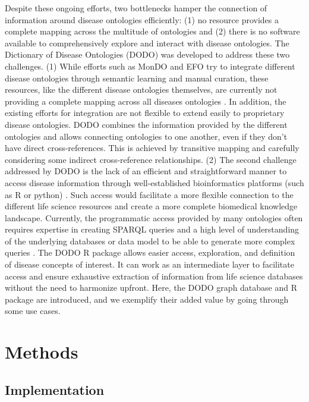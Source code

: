 \documentclass[9pt,a4paper,]{extarticle}
\begin{document}
Despite these ongoing efforts, two bottlenecks hamper the connection of information around disease ontologies efficiently: (1) no resource provides a complete mapping across the multitude of ontologies and (2) there is no software available to comprehensively explore and interact with disease ontologies. The Dictionary of Disease Ontologies (DODO) was developed to address these two challenges. (1) While efforts such as MonDO and EFO try to integrate different disease ontologies through semantic learning and manual curation, these resources, like the different disease ontologies themselves, are currently not providing a complete mapping across all diseases ontologies \citep{Hu2017, Rappaport2013}. In addition, the existing efforts for integration are not flexible to extend easily to proprietary disease ontologies. DODO combines the information provided by the different ontologies and allows connecting ontologies to one another, even if they don't have direct cross-references. This is achieved by transitive mapping and carefully considering some indirect cross-reference relationships. (2) The second challenge addressed by DODO is the lack of an efficient and straightforward manner to access disease information through well-established bioinformatics platforms (such as R or python) \citep{Rappaport2013, Saqi2018}. Such access would facilitate a more flexible connection to the different life science resources and create a more complete biomedical knowledge landscape. Currently, the programmatic access provided by many ontologies often requires expertise in creating SPARQL queries and a high level of understanding of the underlying databases or data model to be able to generate more complex queries \citep{Hasnain2014, Hu2017, Rappaport2013}. The DODO R package allows easier access, exploration, and definition of disease concepts of interest. It can work as an intermediate layer to facilitate access and ensure exhaustive extraction of information from life science databases without the need to harmonize upfront. Here, the DODO graph database and R package are introduced, and we exemplify their added value by going through some use cases.

\hypertarget{methods}{%
\section{Methods}\label{methods}}

\hypertarget{implementation}{%
\subsection{Implementation}\label{implementation}}
\end{document}
